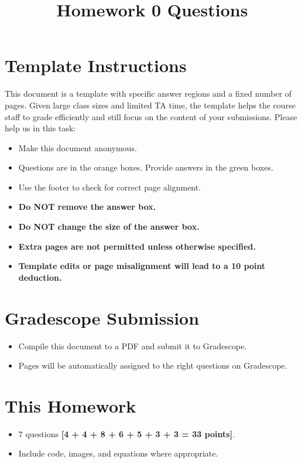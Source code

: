 \documentclass[11pt]{article}
\date{}
\title{\vspace{-1cm}Homework 0 Questions}
\begin{document}
\maketitle
\thispagestyle{fancy}

\section*{Template Instructions}

This document is a template with specific answer regions and a fixed number of pages. Given large class sizes and limited TA time, the template helps the course staff to grade efficiently and still focus on the content of your submissions. Please help us in this task:
 
\begin{itemize}
  \item Make this document anonymous.
  
  \item Questions are in the orange boxes. Provide answers in the green boxes.
  \item Use the footer to check for correct page alignment.

  \item \textbf{Do NOT remove the answer box.}
  \item \textbf{Do NOT change the size of the answer box.}
  \item \textbf{Extra pages are not permitted unless otherwise specified.}
  \item \textbf{Template edits or page misalignment will lead to a 10 point deduction.}
\end{itemize}

\section*{Gradescope Submission}
\begin{itemize}
  \item Compile this document to a PDF and submit it to Gradescope.
  \item Pages will be automatically assigned to the right questions on Gradescope.
\end{itemize}

\section*{This Homework}
\begin{itemize}
  \item 7 questions \textbf{[4 + 4 + 8 + 6 + 5 + 3 + 3 = 33 points]}.
  \item Include code, images, and equations where appropriate.
\end{itemize}
\end{document}

